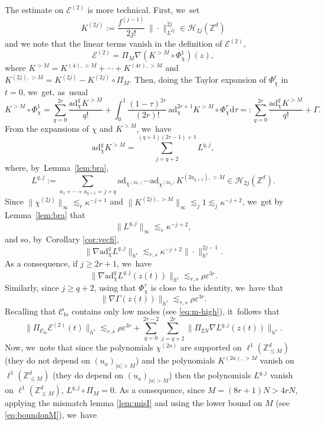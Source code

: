 \documentclass[JEP,XML,SOM,Unicode,published]{cedram}
\theoremstyle{plain}
\theoremstyle{definition}
\DeclareMathOperator{\lo}{lo}
\newcommand{\1}{\mathbf{1}}
\newcommand{\Clo}{\mathscr{C}_{\lo}}
\begin{document}
The estimate on $\mathcal{E}^{(2)}$ is more technical. First, we~set\vspace*{-3pt}
\[
K^{(2j)} := \frac{f^{(j-1)}}{2j!}\, \| \cdot \|_{L^{2j}}^{2j} \in \mathcal{H}_{2j}(\mathbb{Z}^d)
\]
and we note that the linear terms vanish in the definition of $\mathcal{E}^{(2)}$, \ie\vspace*{-3pt}
\[
\mathcal{E}^{(2)} = \Pi_M \nabla (K^{>M} \circ \Phi_\chi^1) (z),
\]
where $K^{>M} = K^{(4),>M}+ \cdots + K^{(4r),>M}$ and $K^{(2j),>M} = K^{(2j)} - K^{(2j)}\circ \Pi_M$. Then, doing the Taylor expansion of $\Phi_\chi^t$ in $t=0$, we~get, as~usual\vspace*{-3pt}
\[
K^{>M} \circ \Phi_\chi^1 = \sum_{q=0}^{2r} \frac{\mathrm{ad}_{\chi}^q K^{>M}}{q!} + \int_0^1 \frac{(1-\tau)^{2r}}{(2r)!}\, \mathrm{ad}_{\chi}^{2r+1} K^{>M}\circ \Phi_\chi^\tau \mathrm{d}\tau =: \sum_{q=0}^{2r} \frac{\mathrm{ad}_{\chi}^q K^{>M}}{q!} + \Gamma.
\]
From the expansions of $\chi$ and $K^{>M}$, we~have\vspace*{-3pt}
\[
\mathrm{ad}_{\chi}^q K^{>M} = \sum_{j=q+2}^{(q+1)(2r-1)+1} L^{q,j},
\]
where, by~Lemma~\ref{lem:bra},\vspace*{-3pt}
\[
L^{q,j} := \sum_{ a_1 + \cdots + a_{q+1} = j+q } \mathrm{ad}_{\chi^{(2a_1)}} \cdots \mathrm{ad}_{\chi^{(2a_q)}} K^{(2a_{q+1}),>M} \in \mathcal{H}_{2j}(\mathbb{Z}^d).
\]
Since $\| \chi^{(2j)} \|_{\infty} \lesssim_r \kappa^{-j+1}$ and $\| K^{(2j),>M} \|_{\infty} \lesssim_j 1 \lesssim_j \kappa^{-j+2}$, we~get by Lemma~\ref{lem:bra} that
\[
\| L^{q,j} \|_{\infty} \lesssim_{r} \kappa^{-j+2},
\]
and so, by~Corollary \ref{cor:vecfi},
\[
\| \nabla \mathrm{ad}_{\chi}^q L^{q,j} \|_{h^s} \lesssim_{r,s} \kappa^{-j+2} \| \cdot\|_{h^s}^{2j-1}.
\]
As a consequence, if $j\geq 2r+1$, we~have
\[
\| \nabla \mathrm{ad}_{\chi}^q L^{q,j} (z(t)) \|_{h^s} \lesssim_{r,s} \rho \varepsilon^{3r}.
\]
Similarly, since $j\geq q+2$, using that $\Phi_\chi^\tau $ is close to the identity, we~have that
\[
\| \nabla \Gamma(z(t)) \|_{h^s} \lesssim_{r,s} \rho \varepsilon^{3r}.
\]
Recalling that $\Clo$ contains only low modes (see \eqref{eq:m-high}), it~follows that
\[
\| \Pi_{\Clo} \mathcal{E}^{(2)}(t)\|_{h^s} \lesssim_{r,s} \rho \varepsilon^{3r} + \sum_{q=0}^{2r-2} \sum_{j=q+2}^{2r} \| \Pi_{2N} \nabla L^{q,j}(z(t)) \|_{h^s}.
\]
Now, we~note that since the polynomials $\chi^{(2a)}$ are supported on $\ell^1(\mathbb{Z}^d_{\leq M})$ (\ie they do not depend on $(u_a)_{|a|>M}$) and the polynomials $K^{(2a),>M}$ vanish on $\ell^1(\mathbb{Z}^d_{\leq M})$ (\ie they do depend on $(u_a)_{|a|>M}$) then the polynomials $L^{q,j}$ vanish on $\ell^1(\mathbb{Z}^d_{\leq M})$, \ie $L^{q,j}\circ \Pi_M =0$. As a consequence, since $M=(8r+1)N>4rN$, applying the mismatch lemma \ref{lem:misI} and using the lower bound on $M$ (see \eqref{eq:boundonM}), we~have
\end{document}
